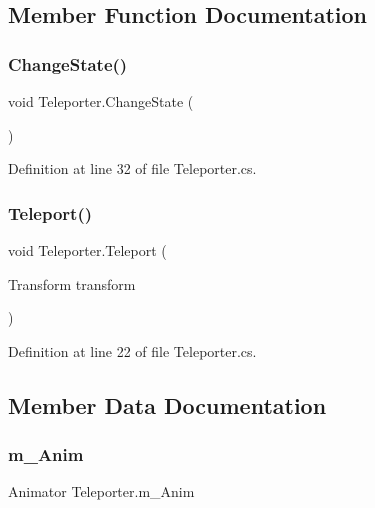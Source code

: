 \subsection{Member Function Documentation}
\mbox{\label{class_teleporter_a112d2c95bfea3c46f4beb3e41fcad824}} 
\subsubsection{\texorpdfstring{Change\+State()}{ChangeState()}}
{\footnotesize\ttfamily void Teleporter.\+Change\+State (\begin{DoxyParamCaption}{ }\end{DoxyParamCaption})}



Definition at line 32 of file Teleporter.\+cs.

\mbox{\label{class_teleporter_a6bb811e6a67e1664b92560845611f401}} 
\subsubsection{\texorpdfstring{Teleport()}{Teleport()}}
{\footnotesize\ttfamily void Teleporter.\+Teleport (\begin{DoxyParamCaption}\item[{Transform}]{transform }\end{DoxyParamCaption})}



Definition at line 22 of file Teleporter.\+cs.



\subsection{Member Data Documentation}
\mbox{\label{class_teleporter_a3aa6874579f096068dfe27284c981903}} 
\subsubsection{\texorpdfstring{m\+\_\+\+Anim}{m\_Anim}}
{\footnotesize\ttfamily Animator Teleporter.\+m\+\_\+\+Anim}



